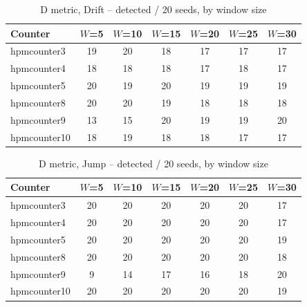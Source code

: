 
\begin{table}[t]
\centering
\caption{D metric, Drift -- detected / 20 seeds, by window size}
\label{tab:window-sweep-d-drift}
\begin{tabular}{@{}lcccccc@{}}
\toprule
Counter & $W$=5 & $W$=10 & $W$=15 & $W$=20 & $W$=25 & $W$=30 \\
\midrule
hpmcounter3  & 19 & 20 & 18 & 17 & 17 & 17 \\
hpmcounter4  & 18 & 18 & 18 & 17 & 18 & 17 \\
hpmcounter5  & 20 & 19 & 20 & 19 & 19 & 19 \\
hpmcounter8  & 20 & 20 & 19 & 18 & 18 & 18 \\
hpmcounter9  & 13 & 15 & 20 & 19 & 19 & 20 \\
hpmcounter10 & 18 & 19 & 18 & 18 & 17 & 17 \\
\bottomrule
\end{tabular}
\end{table}

\begin{table}[t]
\centering
\caption{D metric, Jump -- detected / 20 seeds, by window size}
\label{tab:window-sweep-d-jump}
\begin{tabular}{@{}lcccccc@{}}
\toprule
Counter & $W$=5 & $W$=10 & $W$=15 & $W$=20 & $W$=25 & $W$=30 \\
\midrule
hpmcounter3  & 20 & 20 & 20 & 20 & 20 & 17 \\
hpmcounter4  & 20 & 20 & 20 & 20 & 20 & 17 \\
hpmcounter5  & 20 & 20 & 20 & 20 & 20 & 19 \\
hpmcounter8  & 20 & 20 & 20 & 20 & 20 & 18 \\
hpmcounter9  & 9  & 14 & 17 & 16 & 18 & 20 \\
hpmcounter10 & 20 & 20 & 20 & 20 & 20 & 19 \\
\bottomrule
\end{tabular}
\end{table}

